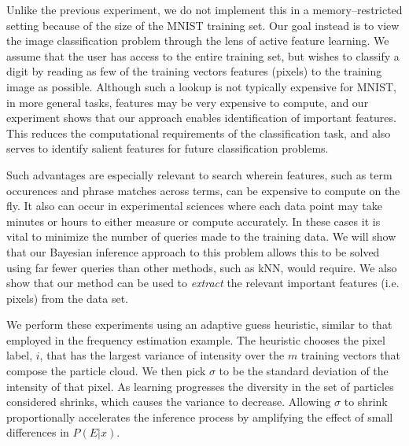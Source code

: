 \documentclass[twoside]{article}
\begin{document}
Unlike the previous experiment, we do not implement this in a memory--restricted
setting because of the size of the MNIST training set.
Our goal instead is to view the image classification problem through the lens of active feature learning.  
We assume that the user has access to the entire training set, but wishes to classify a digit by reading as few of the training vectors features (pixels) to the training
image as possible.  Although such a lookup is not typically expensive for MNIST, in more general tasks, features may be very expensive to compute, and our experiment shows that our approach enables identification of important features.  This reduces the computational requirements of the classification task, and also serves to identify salient features for future 
classification problems.

Such advantages are especially relevant to search wherein features, such as term occurences and phrase matches across terms, can be expensive to compute on the fly.  It also can
occur in experimental sciences where each data point may take minutes or hours to either measure
or compute accurately.  In these cases it is vital to minimize the number of queries made to the training
data.  We will show that our Bayesian inference approach to this problem allows this to be solved using
far fewer queries than other methods, such as kNN, would require.  We also show that our method can
be used to \emph{extract} the relevant important features (i.e. pixels) from the data set.

We perform these experiments using an adaptive guess heuristic, similar to that employed in the frequency estimation example.
The heuristic chooses the pixel label, $i$, that has the largest variance of intensity
over the $m$ training vectors that compose the particle cloud.  We then pick $\sigma$ to be the standard
deviation of the intensity of that pixel.  As learning progresses the diversity in the set of particles
considered shrinks, which causes the variance to decrease.  Allowing $\sigma$ to shrink proportionally accelerates the inference process by amplifying the effect of small differences in $P(E|x)$.  
\end{document}
